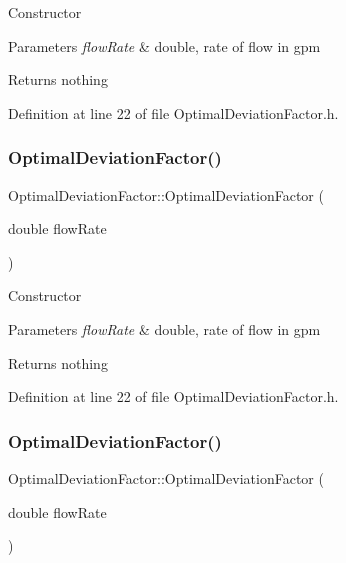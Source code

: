 Constructor 
\begin{DoxyParams}{Parameters}
{\em flow\+Rate} & double, rate of flow in gpm \\
\hline
\end{DoxyParams}
\begin{DoxyReturn}{Returns}
nothing 
\end{DoxyReturn}


Definition at line 22 of file Optimal\+Deviation\+Factor.\+h.

\mbox{\label{class_optimal_deviation_factor_a61e6acfd31d44bc1f2f622407ba1e857}} 
\subsubsection{\texorpdfstring{Optimal\+Deviation\+Factor()}{OptimalDeviationFactor()}\hspace{0.1cm}{\footnotesize\ttfamily [2/3]}}
{\footnotesize\ttfamily Optimal\+Deviation\+Factor\+::\+Optimal\+Deviation\+Factor (\begin{DoxyParamCaption}\item[{double}]{flow\+Rate }\end{DoxyParamCaption})\hspace{0.3cm}{\ttfamily [inline]}}

Constructor 
\begin{DoxyParams}{Parameters}
{\em flow\+Rate} & double, rate of flow in gpm \\
\hline
\end{DoxyParams}
\begin{DoxyReturn}{Returns}
nothing 
\end{DoxyReturn}


Definition at line 22 of file Optimal\+Deviation\+Factor.\+h.

\mbox{\label{class_optimal_deviation_factor_a61e6acfd31d44bc1f2f622407ba1e857}} 
\subsubsection{\texorpdfstring{Optimal\+Deviation\+Factor()}{OptimalDeviationFactor()}\hspace{0.1cm}{\footnotesize\ttfamily [3/3]}}
{\footnotesize\ttfamily Optimal\+Deviation\+Factor\+::\+Optimal\+Deviation\+Factor (\begin{DoxyParamCaption}\item[{double}]{flow\+Rate }\end{DoxyParamCaption})\hspace{0.3cm}{\ttfamily [inline]}}

